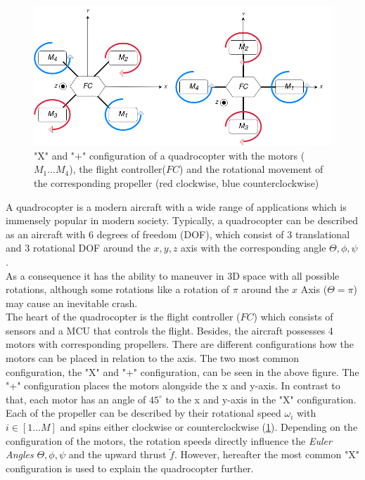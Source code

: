 \begin{figure}
	\centering
	\includegraphics[width= \linewidth]{figures/quad.png} 
	\caption{"X" and "+" configuration of a quadrocopter with the motors ($M_1 ... M_4$), the flight controller($FC$) and the rotational movement of the corresponding propeller (red clockwise, blue counterclockwise)}
	\label{fig:quad}
\end{figure}

A quadrocopter is a modern aircraft with a wide range of applications which is immensely popular in modern society. 
Typically, a quadrocopter can be described as an aircraft with 6 degrees of freedom (DOF), 
which consist of 3 translational and 3 rotational DOF around the $x,y,z$ axis with the corresponding angle $\Theta, \phi, \psi$. \\
As a consequence it has the ability to maneuver in 3D space with all possible rotations, 
although some rotations like a rotation of $\pi$ around the $x$ Axis ($\Theta = \pi$) may cause an inevitable crash. \\
The heart of the quadrocopter is the flight controller ($FC$) which consists of sensors and a MCU that controls the flight. 
Besides, the aircraft possesses 4 motors with corresponding propellers. 
There are different configurations how the motors can be placed in relation to the axis. 
The two most common configuration, the "X" and "+" configuration, can be seen in the above figure. 
The "+" configuration places the motors alongside the x and y-axis. In contrast to that, each motor has an angle of $45^{\circ}$ to the x and y-axis in the "X" configuration.\\
Each of the propeller can be described by their rotational speed $\omega_i$ with $i \in [1...M]$ and spins either clockwise or counterclockwise (\cref{fig:quad}). 
Depending on the configuration of the motors,
the rotation speeds directly influence the \emph{Euler Angles} $\Theta, \phi, \psi$ and
the upward thrust $\tilde{f}$. However, hereafter the most common "X" configuration is used to explain the quadrocopter further.

